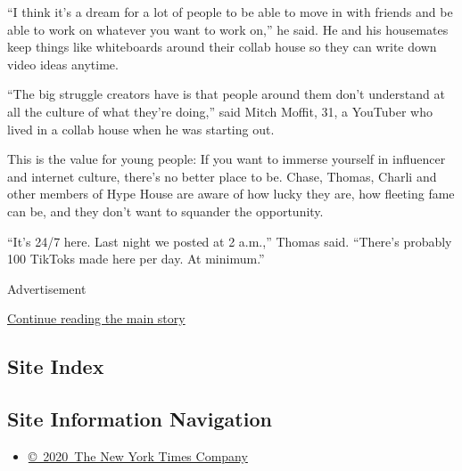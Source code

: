 ``I think it's a dream for a lot of people to be able to move in with
friends and be able to work on whatever you want to work on,'' he said.
He and his housemates keep things like whiteboards around their collab
house so they can write down video ideas anytime.

``The big struggle creators have is that people around them don't
understand at all the culture of what they're doing,'' said Mitch
Moffit, 31, a YouTuber who lived in a collab house when he was starting
out.

This is the value for young people: If you want to immerse yourself in
influencer and internet culture, there's no better place to be. Chase,
Thomas, Charli and other members of Hype House are aware of how lucky
they are, how fleeting fame can be, and they don't want to squander the
opportunity.

``It's 24/7 here. Last night we posted at 2 a.m.,'' Thomas said.
``There's probably 100 TikToks made here per day. At minimum.''

Advertisement

\protect\hyperlink{after-bottom}{Continue reading the main story}

\hypertarget{site-index}{%
\subsection{Site Index}\label{site-index}}

\hypertarget{site-information-navigation}{%
\subsection{Site Information
Navigation}\label{site-information-navigation}}

\begin{itemize}
\tightlist
\item
  \href{https://help.nytimes.com/hc/en-us/articles/115014792127-Copyright-notice}{©~2020~The
  New York Times Company}
\end{itemize}


